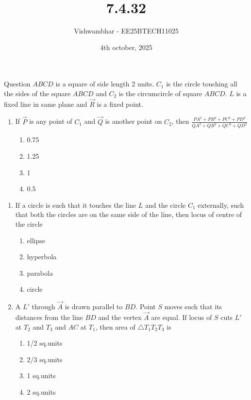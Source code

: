 \documentclass{beamer}
\title{7.4.32}
\date{4th october, 2025}
\author{Vishwambhar - EE25BTECH11025}
\begin{document}
\frame{\titlepage}
\begin{frame}{Question}
$ABCD$ is a square of side length 2 units. $C_1$ is the circle touching all the sides of the square $ABCD$ and $C_2$ is the circumcircle of square $ABCD$. $L$ is a fixed line in same plane and $\vec{R}$ is a fixed point.\\
\begin{enumerate}
    \item If $\vec{P}$ is any point of $C_1$ and $\vec{Q}$ is another point on $C_2$, then $\frac{PA^2+PB^2+PC^2+PD^2}{QA^2+QB^2+QC^2+QD^2}$
    \begin{enumerate}
        \item 0.75
        \item 1.25
        \item 1
        \item 0.5
    \end{enumerate}
    \end{enumerate}
    \end{frame}
    \begin{frame}
    \begin{enumerate}
    \item If a circle is such that it touches the line $L$ and the circle $C_1$ externally, such that both the circles are on the same side of the line, then locus of centre of the circle
    \begin{enumerate}
        \item ellipse
        \item hyperbola
        \item parabola
        \item circle
    \end{enumerate}
    \item A $L'$ through $\vec{A}$ is drawn parallel to $BD$. Point $S$ moves such that its distances from the line $BD$ and the vertex $\vec{A}$ are equal. If locus of $S$ cuts $L'$ at $T_2$ and $T_3$ and $AC$ at $T_1$, then area of $\triangle T_1T_2T_3$ is
    \begin{enumerate}
        \item 1/2 sq.units
        \item 2/3 sq.units
        \item 1 sq.units
        \item 2 sq.units
    \end{enumerate}
\end{enumerate}
\end{frame}
\end{document}
